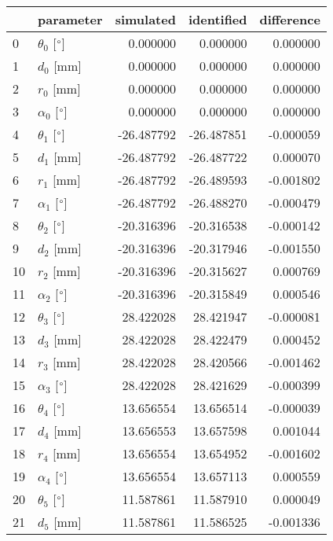 \documentclass{standalone}%
\begin{document}
%
\normalsize%
\begin{tabular}{llrrr}
\toprule
{} &                 parameter &  simulated & identified & difference \\
\midrule
0  &  $\theta_{0}$ [$\degree$] &   0.000000 &   0.000000 &   0.000000 \\
1  &              $d_{0}$ [mm] &   0.000000 &   0.000000 &   0.000000 \\
2  &              $r_{0}$ [mm] &   0.000000 &   0.000000 &   0.000000 \\
3  &  $\alpha_{0}$ [$\degree$] &   0.000000 &   0.000000 &   0.000000 \\
4  &  $\theta_{1}$ [$\degree$] & -26.487792 & -26.487851 &  -0.000059 \\
5  &              $d_{1}$ [mm] & -26.487792 & -26.487722 &   0.000070 \\
6  &              $r_{1}$ [mm] & -26.487792 & -26.489593 &  -0.001802 \\
7  &  $\alpha_{1}$ [$\degree$] & -26.487792 & -26.488270 &  -0.000479 \\
8  &  $\theta_{2}$ [$\degree$] & -20.316396 & -20.316538 &  -0.000142 \\
9  &              $d_{2}$ [mm] & -20.316396 & -20.317946 &  -0.001550 \\
10 &              $r_{2}$ [mm] & -20.316396 & -20.315627 &   0.000769 \\
11 &  $\alpha_{2}$ [$\degree$] & -20.316396 & -20.315849 &   0.000546 \\
12 &  $\theta_{3}$ [$\degree$] &  28.422028 &  28.421947 &  -0.000081 \\
13 &              $d_{3}$ [mm] &  28.422028 &  28.422479 &   0.000452 \\
14 &              $r_{3}$ [mm] &  28.422028 &  28.420566 &  -0.001462 \\
15 &  $\alpha_{3}$ [$\degree$] &  28.422028 &  28.421629 &  -0.000399 \\
16 &  $\theta_{4}$ [$\degree$] &  13.656554 &  13.656514 &  -0.000039 \\
17 &              $d_{4}$ [mm] &  13.656553 &  13.657598 &   0.001044 \\
18 &              $r_{4}$ [mm] &  13.656554 &  13.654952 &  -0.001602 \\
19 &  $\alpha_{4}$ [$\degree$] &  13.656554 &  13.657113 &   0.000559 \\
20 &  $\theta_{5}$ [$\degree$] &  11.587861 &  11.587910 &   0.000049 \\
21 &              $d_{5}$ [mm] &  11.587861 &  11.586525 &  -0.001336 \\

\end{tabular}
\end{document}
